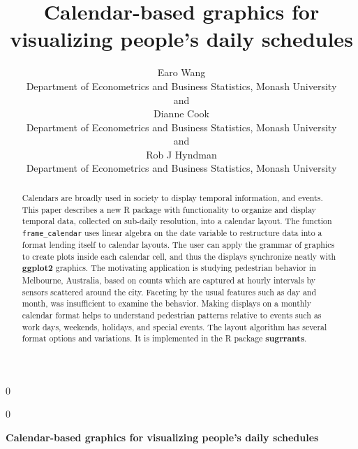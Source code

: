 \documentclass[12pt]{article}
\newcommand{\blind}{0}
\begin{document}
\def\spacingset#1{\renewcommand{\baselinestretch}%
{#1}\small\normalsize} \spacingset{1}



\blind
{
  \title{\bf Calendar-based graphics for visualizing people's daily schedules}

  \author{
        Earo Wang \\
    Department of Econometrics and Business Statistics, Monash University\\
     and \\     Dianne Cook \\
    Department of Econometrics and Business Statistics, Monash University\\
     and \\     Rob J Hyndman \\
    Department of Econometrics and Business Statistics, Monash University\\
      }
  \maketitle
} \fi

\blind
{
  \bigskip
  \bigskip
  \bigskip
  \begin{center}
    {\LARGE\bf Calendar-based graphics for visualizing people's daily schedules}
  \end{center}
  \medskip
} \fi

\bigskip
\begin{abstract}
Calendars are broadly used in society to display temporal information,
and events. This paper describes a new R package with functionality to
organize and display temporal data, collected on sub-daily resolution,
into a calendar layout. The function \texttt{frame\_calendar} uses
linear algebra on the date variable to restructure data into a format
lending itself to calendar layouts. The user can apply the grammar of
graphics to create plots inside each calendar cell, and thus the
displays synchronize neatly with \textbf{ggplot2} graphics. The
motivating application is studying pedestrian behavior in Melbourne,
Australia, based on counts which are captured at hourly intervals by
sensors scattered around the city. Faceting by the usual features such
as day and month, was insufficient to examine the behavior. Making
displays on a monthly calendar format helps to understand pedestrian
patterns relative to events such as work days, weekends, holidays, and
special events. The layout algorithm has several format options and
variations. It is implemented in the R package \textbf{sugrrants}.
\end{abstract}
\end{document}
